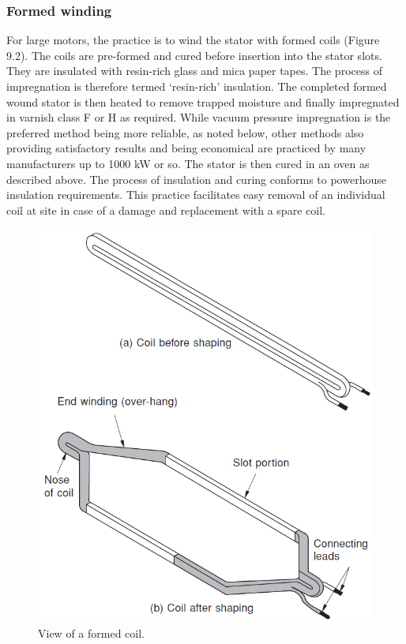 \subsubsection*{Formed winding}

For large motors, the practice is to wind the stator with formed coils (Figure 9.2). The coils are pre-formed and cured before insertion into the stator slots. They are insulated with resin-rich glass and mica paper tapes. The process of impregnation is therefore termed ‘resin-rich’ insulation. The completed formed wound stator is then heated to remove trapped moisture and finally impregnated in varnish class F or H as required. While vacuum pressure impregnation is the preferred method being more reliable, as noted below, other methods also providing satisfactory results and being economical are practiced by many manufacturers up to 1000 kW or so. The stator is then cured in an oven as described above. The process of insulation and curing conforms to powerhouse insulation requirements. This practice facilitates easy removal of an individual coil at site in case of a damage and replacement with a spare coil.

\begin{figure}[h]
 \centerline{\includegraphics[width=.85\columnwidth]{.//figures/form_coil.png}}
 \caption{View of a formed coil.}
 \label{fig:form_coil}
\end{figure}


